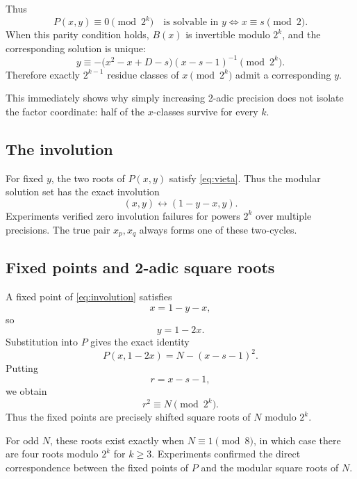\documentclass[11pt,a4paper]{article}
\begin{document}
Thus
\begin{equation}
\boxed{
P(x,y)\equiv0\pmod{2^k}
\quad\text{is solvable in }y
\iff x\equiv s\pmod2.
}
\label{eq:parity}
\end{equation}
When this parity condition holds, \(B(x)\) is invertible modulo \(2^k\), and the corresponding solution is unique:
\begin{equation}
\boxed{
 y\equiv-\bigl(x^2-x+D-s\bigr)(x-s-1)^{-1}\pmod{2^k}.
}
\label{eq:y2adic}
\end{equation}
Therefore exactly \(2^{k-1}\) residue classes of \(x\pmod{2^k}\) admit a corresponding \(y\).

This immediately shows why simply increasing 2-adic precision does not isolate the factor coordinate: half of the \(x\)-classes survive for every \(k\).

\subsection{The involution}

For fixed \(y\), the two roots of \(P(x,y)\) satisfy \eqref{eq:vieta}. Thus the modular solution set has the exact involution
\begin{equation}
\boxed{(x,y)\longleftrightarrow(1-y-x,y).}
\label{eq:involution}
\end{equation}
Experiments verified zero involution failures for powers \(2^k\) over multiple precisions. The true pair \(x_p,x_q\) always forms one of these two-cycles.

\subsection{Fixed points and 2-adic square roots}

A fixed point of \eqref{eq:involution} satisfies
\[
x=1-y-x,
\]
so
\[
y=1-2x.
\]
Substitution into \(P\) gives the exact identity
\begin{equation}
\boxed{
P(x,1-2x)=N-(x-s-1)^2.
}
\label{eq:fixedsquare}
\end{equation}
Putting
\[
r=x-s-1,
\]
we obtain
\begin{equation}
\boxed{r^2\equiv N\pmod{2^k}.}
\label{eq:2roots}
\end{equation}
Thus the fixed points are precisely shifted square roots of \(N\) modulo \(2^k\).

For odd \(N\), these roots exist exactly when \(N\equiv1\pmod8\), in which case there are four roots modulo \(2^k\) for \(k\ge3\). Experiments confirmed the direct correspondence between the fixed points of \(P\) and the modular square roots of \(N\).
\end{document}
